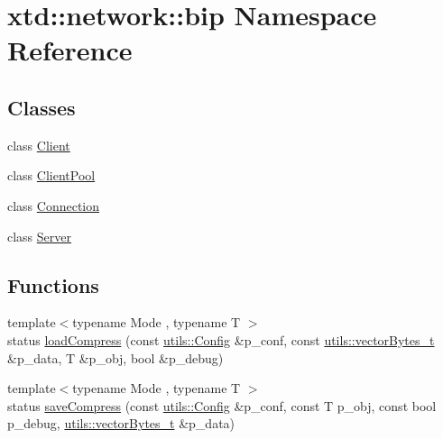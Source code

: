 \hypertarget{namespacextd_1_1network_1_1bip}{\section{xtd\-:\-:network\-:\-:bip Namespace Reference}
\label{namespacextd_1_1network_1_1bip}
}
\subsection*{Classes}
\begin{DoxyCompactItemize}
\item 
class \hyperlink{classxtd_1_1network_1_1bip_1_1Client}{Client}
\item 
class \hyperlink{classxtd_1_1network_1_1bip_1_1ClientPool}{Client\-Pool}
\item 
class \hyperlink{classxtd_1_1network_1_1bip_1_1Connection}{Connection}
\item 
class \hyperlink{classxtd_1_1network_1_1bip_1_1Server}{Server}
\end{DoxyCompactItemize}
\subsection*{Functions}
\begin{DoxyCompactItemize}
\item 
{\footnotesize template$<$typename Mode , typename T $>$ }\\status \hyperlink{namespacextd_1_1network_1_1bip_a48193a997dc7b1e8f5515c86ec50405c}{load\-Compress} (const \hyperlink{classxtd_1_1network_1_1utils_1_1Config}{utils\-::\-Config} \&p\-\_\-conf, const \hyperlink{namespacextd_1_1network_1_1utils_a9fedf0d18549b8034e9ae347955e9a9a}{utils\-::vector\-Bytes\-\_\-t} \&p\-\_\-data, T \&p\-\_\-obj, bool \&p\-\_\-debug)
\item 
{\footnotesize template$<$typename Mode , typename T $>$ }\\status \hyperlink{namespacextd_1_1network_1_1bip_a86bf6b3f22dd9b8c49cc138e4cd44921}{save\-Compress} (const \hyperlink{classxtd_1_1network_1_1utils_1_1Config}{utils\-::\-Config} \&p\-\_\-conf, const T p\-\_\-obj, const bool p\-\_\-debug, \hyperlink{namespacextd_1_1network_1_1utils_a9fedf0d18549b8034e9ae347955e9a9a}{utils\-::vector\-Bytes\-\_\-t} \&p\-\_\-data)
\end{DoxyCompactItemize}


